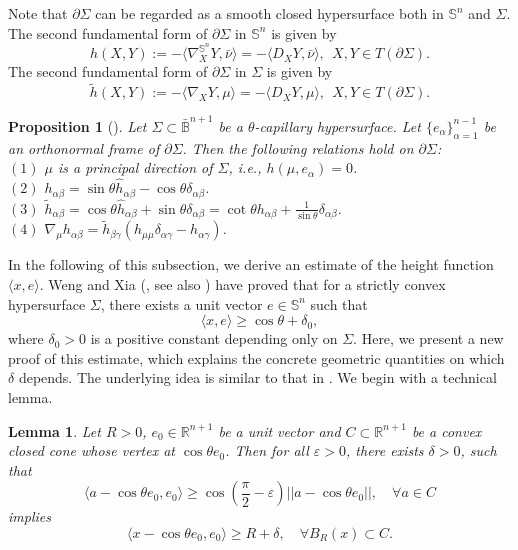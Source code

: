 \documentclass[11pt,reqno]{amsart}
\newtheorem{lem}[thm]{Lemma}
\newtheorem{prop}[thm]{Proposition}
\theoremstyle{definition}
\theoremstyle{remark}
\numberwithin{equation}{section}
\renewcommand{\(}{\left(}
\renewcommand{\)}{\right)}
\renewcommand{\-}{\overline}
\begin{document}
Note that $\partial\Sigma$ can be regarded as a smooth closed hypersurface both in $\mathbb{S}^n$ and $\Sigma$. The second fundamental form of $\partial\Sigma$ in $\mathbb{S}^n$ is given by
\begin{equation*}
	\widehat{h}(X,Y):=-\langle\nabla^{\mathbb{S}^n}_X Y,\bar{\nu}\rangle=-\langle D_XY,\bar{\nu}\rangle,\ \ X,Y\in T(\partial\Sigma).
\end{equation*}
The second fundamental form of $\partial\Sigma$ in $\Sigma$ is given by
\begin{equation*}
	\tilde{h}(X,Y):=-\langle\nabla_X Y,\mu\rangle=-\langle D_XY,\mu\rangle,\ \ X,Y\in T(\partial\Sigma).
\end{equation*}

\begin{prop}[\cite{Weng-Xia2022}]\label{boundary-h-property}
	Let $\Sigma\subset\bar{\mathbb{B}}^{n+1}$ be a $\theta$-capillary hypersurface. Let $\{e_\alpha\}_{\alpha=1}^{n-1}$ be an orthonormal frame of $\partial\Sigma$. Then the following relations hold on $\partial \Sigma$:\\
	$(1)$ $\mu$ is a principal direction of $\Sigma$, i.e., $h(\mu,e_\alpha)=0$.\\
	$(2)$ $h_{\alpha\beta}=\sin\theta\widehat{h}_{\alpha\beta}-\cos\theta\delta_{\alpha\beta}$.\\
	$(3)$ $\tilde{h}_{\alpha\beta}=\cos\theta\widehat{h}_{\alpha\beta}+\sin\theta\delta_{\alpha\beta}=\cot\theta h_{\alpha\beta}+\frac{1}{\sin\theta}\delta_{\alpha\beta}$.\\
	$(4)$ $\nabla_\mu h_{\alpha\beta}=\tilde{h}_{\beta\gamma}\left(h_{\mu\mu}\delta_{\alpha\gamma}-h_{\alpha\gamma}\right)$.
\end{prop}
In the following of this subsection, we derive an estimate of the height function $\langle x,e\rangle$. Weng and Xia (\cite[Proposition 2.16]{Weng-Xia2022}, see also \cite[Proposition 2.5]{HWYZ-2023}) have proved that for a strictly convex hypersurface $\Sigma$, there exists a unit vector $e\in\mathbb{S}^n$ such that 
\begin{equation}\label{es-h-1}
	\langle x,e\rangle\geq \cos\theta+\delta_0,
\end{equation}
where $\delta_0>0$ is a positive constant depending only on $\Sigma$. Here, we present a new proof of this estimate,  which explains the concrete geometric quantities on which  $\delta$ depends. The underlying idea is similar to that in \cite{Lambert-Scheuer2016}. We begin with a technical lemma.
\begin{lem}\label{Lem-2.2}
	Let $R>0$, $e_0\in\mathbb{R}^{n+1}$ be a unit vector and $C\subset\mathbb{R}^{n+1}$ be a convex closed cone whose vertex at $\cos\theta e_0$. Then for all $\varepsilon>0$, there exists $\delta>0$, such that
	\begin{equation*}
		\langle a-\cos\theta e_0,e_0\rangle\geq \cos\left(\frac{\pi}{2}-\varepsilon\right)||a-\cos\theta e_0||,\quad \forall a\in C
	\end{equation*}
implies
\begin{equation*}
	\langle x-\cos\theta e_0,e_0\rangle\geq R+\delta,\quad \forall B_R(x)\subset C.
\end{equation*}	
\end{lem}
\end{document}
